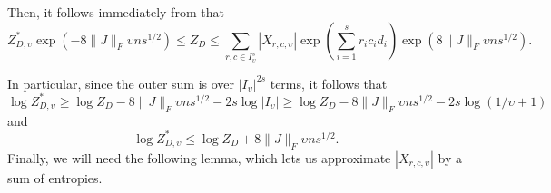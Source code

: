 \documentclass[final, 12pt]{colt2018}
\theoremstyle{definition}
\theoremstyle{plain}
\begin{document}
Then, it follows immediately from  that 
\[
Z^{*}_{D,\upsilon}\exp\left(-8\|J\|_F\upsilon ns^{1/2}\right) \leq Z_{D}\leq\sum_{r,c\in I_{\upsilon}^{s}}|X_{r,c,\upsilon}|\exp\left(\sum_{i=1}^{s}r_{i}c_{i}d_{i}\right)\exp\left(8\|J\|_F\upsilon ns^{1/2}\right).
\]

In particular, since the outer sum is over $|I_{\upsilon}|^{2s}$ terms, it follows
that
\begin{equation}
\label{eqn:approx-sum-by-max-lb}
\log Z_{D,\upsilon}^{*}\geq\log Z_{D}-8\|J\|_F\upsilon ns^{1/2} - 2s\log |I_\upsilon| \ge \log Z_{D}-8\|J\|_F\upsilon ns^{1/2} - 2s\log(1/\upsilon + 1)
\end{equation}
and
\begin{equation}
\label{eqn:approx-sum-by-max-ub}
\log Z^{*}_{D,\upsilon}\leq\log Z_{D}+8\|J\|_F\upsilon ns^{1/2}.
\end{equation}
\iffalse %
Finally, we will need the following lemma, which lets us approximate $|X_{r,c,\upsilon}|$ by a sum of entropies.    
\end{document}
